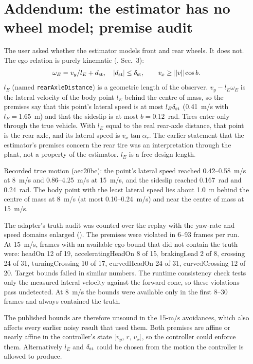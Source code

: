 \documentclass[11pt]{article}
\begin{document}
\section{Addendum: the estimator has no wheel model; premise audit}
The user asked whether the estimator models front and rear wheels. It does
not. The ego relation is purely kinematic (,
Sec.~3):
\[
\omega_E=v_y/l_E+d_{\rm st},\quad|d_{\rm st}|\le\delta_{\rm st},\qquad
v_x\ge\|v\|\cos b .
\]
$l_E$ (named \texttt{rearAxleDistance}) is a geometric length of the observer.
$v_y-l_E\omega_E$ is the lateral velocity of the body point $l_E$ behind the
centre of mass, so the premises say that this point's lateral speed is at
most $l_E\delta_{\rm st}$ (0.41~m/s with $l_E=1.65$~m) and that the sideslip is
at most $b=0.12$~rad. Tires enter only through the true vehicle. With
$l_E$ equal to the real rear-axle distance, that point is the rear axle, and
its lateral speed is $v_x\tan\alpha_r$. The earlier statement that the
estimator's premises concern the rear tire was an interpretation through the
plant, not a property of the estimator. $l_E$ is a free design length.

Recorded true motion (aec20bc): the point's lateral speed reached 0.42--0.58~m/s
at 8~m/s and 0.86--4.25~m/s at 15~m/s, and the sideslip reached 0.167~rad and
0.24~rad. The body point with the least lateral speed lies about 1.0~m behind
the centre of mass at 8~m/s (at most 0.10--0.24~m/s) and near the centre of
mass at 15~m/s.

The adapter's truth audit was counted over the replay with the yaw-rate and
speed domains enlarged ().
The premises were violated in 6--93 frames per run. At 15~m/s, frames with an
available ego bound that did not contain the truth were: headOn 12 of 19,
acceleratingHeadOn 8 of 15, brakingLead 2 of 8, crossing 24 of 31,
turningCrossing 10 of 17, curvedHeadOn 24 of 31, curvedCrossing 12 of 20.
Target bounds failed in similar numbers. The runtime consistency check tests
only the measured lateral velocity against the forward cone, so these
violations pass undetected. At 8~m/s the bounds were available only in the
first 8--30 frames and always contained the truth.

The published bounds are therefore unsound in the 15-m/s avoidances, which
also affects every earlier noisy result that used them. Both premises are
affine or nearly affine in the controller's state [$v_y$, $r$, $v_x$], so the
controller could enforce them. Alternatively $l_E$ and $\delta_{\rm st}$ could
be chosen from the motion the controller is allowed to produce.
\end{document}
